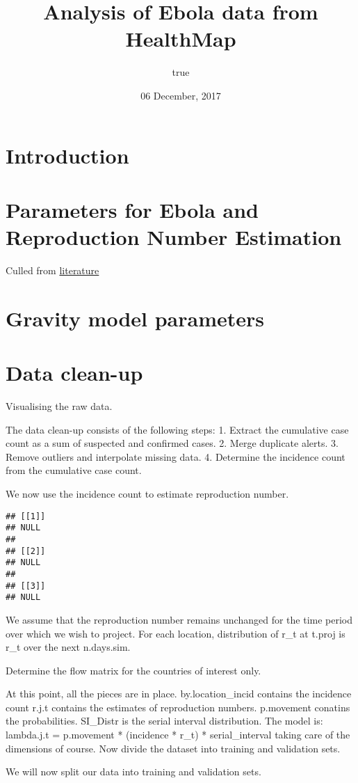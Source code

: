 \documentclass[11pt,]{article}
\title{Analysis of Ebola data from HealthMap}
\author{true}
\date{06 December, 2017}
\begin{document}
\maketitle

\section{Introduction}\label{introduction}

\section{Parameters for Ebola and Reproduction Number
Estimation}\label{parameters-for-ebola-and-reproduction-number-estimation}

Culled from
\href{http://www.nejm.org/doi/suppl/10.1056/NEJMc1414992/suppl_file/nejmc1414992_appendix.pdf}{literature}

\section{Gravity model parameters}\label{gravity-model-parameters}

\section{Data clean-up}\label{data-clean-up}

Visualising the raw data.

The data clean-up consists of the following steps: 1. Extract the
cumulative case count as a sum of suspected and confirmed cases. 2.
Merge duplicate alerts. 3. Remove outliers and interpolate missing data.
4. Determine the incidence count from the cumulative case count.

We now use the incidence count to estimate reproduction number.

\begin{verbatim}
## [[1]]
## NULL
## 
## [[2]]
## NULL
## 
## [[3]]
## NULL
\end{verbatim}

We assume that the reproduction number remains unchanged for the time
period over which we wish to project. For each location, distribution of
r\_t at t.proj is r\_t over the next n.days.sim.

Determine the flow matrix for the countries of interest only.

At this point, all the pieces are in place. by.location\_incid contains
the incidence count r.j.t contains the estimates of reproduction
numbers. p.movement conatins the probabilities. SI\_Distr is the serial
interval distribution. The model is: lambda.j.t = p.movement *
(incidence * r\_t) * serial\_interval taking care of the dimensions of
course. Now divide the dataset into training and validation sets.

We will now split our data into training and validation sets.
\end{document}

